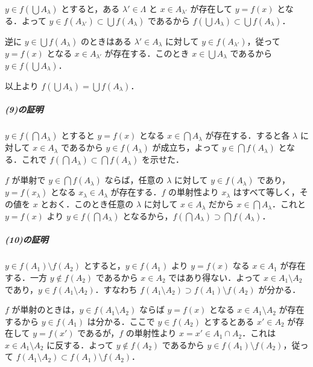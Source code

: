 \documentclass[a5paper,pandoc]{bxjsarticle}
\let\oldsubparagraph\subparagraph
\renewcommand{\subparagraph}[1]{\oldsubparagraph{#1}\mbox{}}
\begin{document}
\(y \in f(\bigcup A_\lambda)\) とすると，ある \(\lambda' \in \Lambda\)
と \(x \in A_{\lambda'}\) が存在して \(y = f(x)\) となる．よって
\(y \in f(A_{\lambda'}) \subset \bigcup f(A_\lambda)\) であるから
\(f(\bigcup A_\lambda) \subset \bigcup f(A_\lambda)\)．

逆に \(y \in \bigcup f(A_\lambda)\) のときはある
\(\lambda' \in A_\lambda\) に対して \(y \in f(A_{\lambda'})\)，従って
\(y = f(x)\) となる \(x \in A_{\lambda'}\) が存在する．このとき
\(x \in \bigcup A_\lambda\) であるから \(y \in f(\bigcup A_\lambda)\)．

以上より \(f(\bigcup A_\lambda) = \bigcup f(A_\lambda)\)．

\hypertarget{ux306eux8a3cux660e-5}{%
\subparagraph{(9)の証明}\label{ux306eux8a3cux660e-5}}

\(y \in f(\bigcap A_\lambda)\) とすると \(y = f(x)\) となる
\(x \in \bigcap A_\lambda\) が存在する．すると各 \(\lambda\) に対して
\(x \in A_\lambda\) であるから \(y \in f(A_\lambda)\) が成立ち，よって
\(y \in \bigcap f(A_\lambda)\) となる．これで
\(f(\bigcap A_\lambda) \subset \bigcap f(A_\lambda)\) を示せた．

\(f\) が単射で \(y \in \bigcap f(A_\lambda)\) ならば，任意の \(\lambda\)
に対して \(y \in f(A_\lambda)\) であり，\(y = f(x_\lambda)\) となる
\(x_\lambda \in A_\lambda\) が存在する．\(f\) の単射性より \(x_\lambda\)
はすべて等しく，その値を \(x\) とおく．このとき任意の \(\lambda\)
に対して \(x \in A_\lambda\) だから \(x \in \bigcap A_\lambda\)．これと
\(y = f(x)\) より \(y \in f(\bigcap A_\lambda)\)
となるから，\(f(\bigcap A_\lambda) \supset \bigcap f(A_\lambda)\)．

\hypertarget{ux306eux8a3cux660e-6}{%
\subparagraph{(10)の証明}\label{ux306eux8a3cux660e-6}}

\(y \in f(A_1) \setminus f(A_2)\) とすると，\(y \in f(A_1)\) より
\(y = f(x)\) なる \(x \in A_1\) が存在する．一方 \(y \notin f(A_2)\)
であるから \(x \in A_2\) ではあり得ない．よって
\(x \in A_1 \setminus A_2\)
であり，\(y \in f(A_1 \setminus A_2)\)．すなわち
\(f(A_1 \setminus A_2) \supset f(A_1) \setminus f(A_2)\) が分かる．

\(f\) が単射のときは，\(y \in f(A_1 \setminus A_2)\) ならば \(y = f(x)\)
となる \(x \in A_1 \setminus A_2\) が存在するから \(y \in f(A_1)\)
は分かる．ここで \(y \in f(A_2)\) とするとある \(x' \in A_2\) が存在して
\(y = f(x')\) であるが，\(f\) の単射性より
\(x = x' \in A_1 \cap A_2\)．これは \(x \in A_1 \setminus A_2\)
に反する．よって \(y \notin f(A_2)\) であるから
\(y \in f(A_1) \setminus f(A_2)\)，従って
\(f(A_1 \setminus A_2) \subset f(A_1) \setminus f(A_2)\)．
\end{document}
